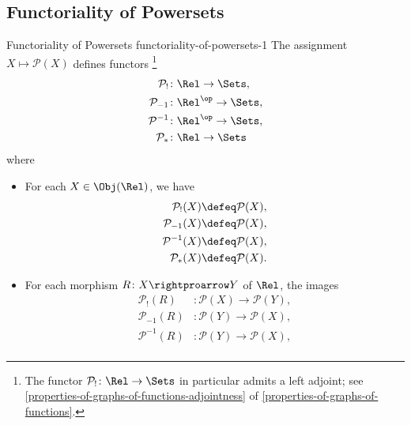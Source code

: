 \subsection{Functoriality of Powersets}\label{subsection-functoriality-of-powersets}
\begin{proposition}{Functoriality of Powersets \rmI}{functoriality-of-powersets-1}%
    The assignment $X\mapsto\mathcal{P}(X)$ defines functors%
    \footnote{%
        The functor $\mathcal{P}_{!}\colon\Rel\to\Sets$ in particular admits a left adjoint; see \cref{properties-of-graphs-of-functions-adjointness} of \cref{properties-of-graphs-of-functions}.
        \par\vspace*{\TCBBoxCorrection}
    }%
    \begin{align*}
        \mathcal{P}_{!}  &\colon \Rel       \to \Sets,\\%
        \mathcal{P}_{-1} &\colon \Rel^{\op} \to \Sets,\\%
        \mathcal{P}^{-1} &\colon \Rel^{\op} \to \Sets,\\%
        \mathcal{P}_{*}  &\colon \Rel       \to \Sets%
    \end{align*}
    where
    \begin{itemize}
        \item{}For each $X\in\Obj(\Rel)$, we have
            \begin{align*}
                \mathcal{P}_{!}(X)  &\defeq \mathcal{P}(X),\\%
                \mathcal{P}_{-1}(X) &\defeq \mathcal{P}(X),\\%
                \mathcal{P}^{-1}(X) &\defeq \mathcal{P}(X),\\%
                \mathcal{P}_{*}(X)  &\defeq \mathcal{P}(X).%
            \end{align*}
        \item{}For each morphism $R\colon X\rightproarrow Y$ of $\Rel$, the images
            \begin{align*}
                \mathcal{P}_{!}(R)  &\colon \mathcal{P}(X) \to \mathcal{P}(Y),\\%
                \mathcal{P}_{-1}(R) &\colon \mathcal{P}(Y) \to \mathcal{P}(X),\\%
                \mathcal{P}^{-1}(R) &\colon \mathcal{P}(Y) \to \mathcal{P}(X),\\%

\end{align*}
\end{itemize}
\end{proposition}
